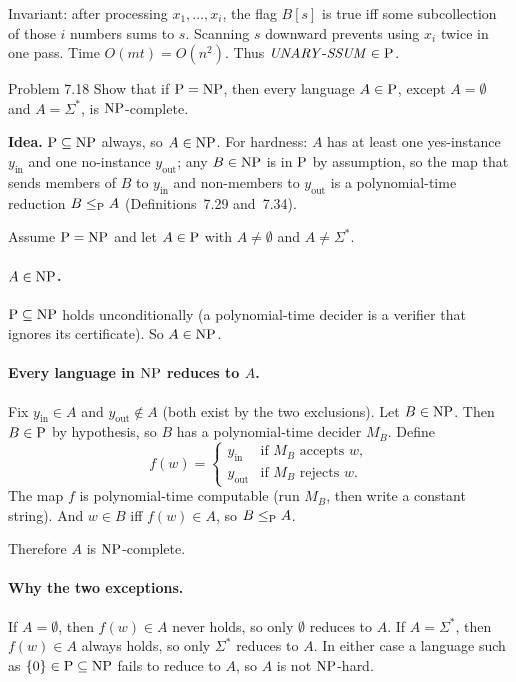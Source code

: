 \begin{soln}
Invariant: after processing $x_1,\dots,x_i$, the flag $B[s]$ is true iff some subcollection of those $i$ numbers sums to $s$. Scanning $s$ downward prevents using $x_i$ twice in one pass. Time $O(m t)=O(n^2)$. Thus $\mathit{UNARY\text{-}SSUM}\in\mathrm{P}$.
\end{soln}

\begin{question}{Problem 7.18}
Show that if $\mathrm{P}=\mathrm{NP}$, then every language $A\in\mathrm{P}$, except $A=\emptyset$ and $A=\Sigma^*$, is $\mathrm{NP}$-complete.
\end{question}
\begin{soln}
\textbf{Idea.} $\mathrm{P}\subseteq\mathrm{NP}$ always, so $A\in\mathrm{NP}$. For hardness: $A$ has at least one yes-instance $y_{\mathrm{in}}$ and one no-instance $y_{\mathrm{out}}$; any $B\in\mathrm{NP}$ is in $\mathrm{P}$ by assumption, so the map that sends members of $B$ to $y_{\mathrm{in}}$ and non-members to $y_{\mathrm{out}}$ is a polynomial-time reduction $B\le_{\mathrm{P}} A$ (Definitions~7.29 and~7.34).

Assume $\mathrm{P}=\mathrm{NP}$ and let $A\in\mathrm{P}$ with $A\neq\emptyset$ and $A\neq\Sigma^*$.

\paragraph{$A\in\mathrm{NP}$.}
$\mathrm{P}\subseteq\mathrm{NP}$ holds unconditionally (a polynomial-time decider is a verifier that ignores its certificate). So $A\in\mathrm{NP}$.

\paragraph{Every language in $\mathrm{NP}$ reduces to $A$.}
Fix $y_{\mathrm{in}}\in A$ and $y_{\mathrm{out}}\notin A$ (both exist by the two exclusions). Let $B\in\mathrm{NP}$. Then $B\in\mathrm{P}$ by hypothesis, so $B$ has a polynomial-time decider $M_B$. Define
\[
f(w)=\begin{cases}
y_{\mathrm{in}}  & \text{if $M_B$ accepts $w$},\\
y_{\mathrm{out}} & \text{if $M_B$ rejects $w$}.
\end{cases}
\]
The map $f$ is polynomial-time computable (run $M_B$, then write a constant string). And $w\in B$ iff $f(w)\in A$, so $B\le_{\mathrm{P}} A$.

Therefore $A$ is $\mathrm{NP}$-complete.

\paragraph{Why the two exceptions.}
If $A=\emptyset$, then $f(w)\in A$ never holds, so only $\emptyset$ reduces to $A$. If $A=\Sigma^*$, then $f(w)\in A$ always holds, so only $\Sigma^*$ reduces to $A$. In either case a language such as $\{0\}\in\mathrm{P}\subseteq\mathrm{NP}$ fails to reduce to $A$, so $A$ is not $\mathrm{NP}$-hard.
\end{soln}
